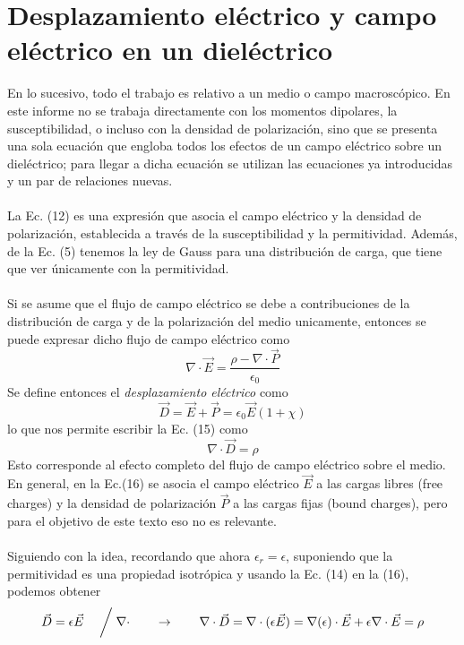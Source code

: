\documentclass[12pt, oneside, numbers, spanish]{ezthesis}
\numberwithin{equation}{section}
\begin{document}
\section{Desplazamiento eléctrico y campo eléctrico en un dieléctrico}
En lo sucesivo, todo el trabajo es relativo a un medio o campo macroscópico. En este informe no se trabaja directamente con los momentos dipolares, la susceptibilidad, o incluso con la densidad de polarización, sino que se presenta una sola ecuación que engloba todos los efectos de un campo eléctrico sobre un dieléctrico; para llegar a dicha ecuación se utilizan las ecuaciones ya introducidas y un par de relaciones nuevas.\\\\
La Ec. (12) es una expresión que asocia el campo eléctrico y la densidad de polarización, establecida a través de la susceptibilidad y la permitividad. Además, de la Ec. (5) tenemos la ley de Gauss para una distribución de carga, que tiene que ver únicamente con la permitividad.\\\\
Si se asume que el flujo de campo eléctrico se debe a contribuciones de la distribución de carga y de la polarización del medio unicamente, entonces se puede expresar dicho flujo de campo eléctrico como
\begin{equation}
\nabla\cdot\vec{E} = \frac{\rho - \nabla\cdot\vec{P}}{\epsilon_0}
\end{equation}
Se define entonces el \textit{desplazamiento eléctrico} como
\begin{equation}
\vec{D} = \vec{E} + \vec{P} = \epsilon_0\vec{E}(1 + \chi)
\end{equation}
lo que nos permite escribir la Ec. (15) como
\begin{equation}
\nabla\cdot\vec{D} = \rho
\end{equation}
Esto corresponde al efecto completo del flujo de campo eléctrico sobre el medio. En general, en la Ec.(16) se asocia el campo eléctrico $\vec{E}$ a las cargas libres (free charges) y la densidad de polarización $\vec{P}$ a las cargas fijas (bound charges), pero para el objetivo de este texto eso no es relevante.\\\\
Siguiendo con la idea, recordando que ahora $\epsilon_r = \epsilon$, suponiendo que la permitividad es una propiedad isotrópica y usando la Ec. (14) en la (16), podemos obtener
\begin{equation}
\vec{D} = \epsilon\vec{E}\quad\biggm/\nabla\cdot\qquad\rightarrow\qquad\nabla\cdot\vec{D}=\nabla\cdot(\epsilon\vec{E}) = \nabla(\epsilon)\cdot\vec{E} + \epsilon\nabla\cdot\vec{E} = \rho
\end{equation}
\end{document}
